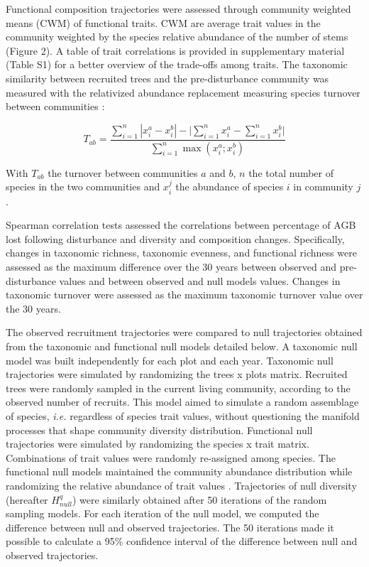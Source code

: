 \documentclass[fleqn,10pt]{ArtEcoFoG} %
\begin{document}
Functional composition trajectories were assessed through community weighted means (CWM) of functional traits. CWM are average trait values in the community weighted by the species relative abundance of the number of stems \citep{Diaz2007} (Figure 2).
A table of trait correlations is provided in supplementary material (Table S1) for a better overview of the trade-offs among traits.
The taxonomic similarity between recruited trees and the pre-disturbance community was measured with the relativized abundance replacement measuring species turnover between communities \citep{Podani2013a}:

\begin{equation}
T_{ab}=\frac{\sum_{i=1}^{n}|x_i^a - x_i^b| - \bigg| \sum_{i=1}^{n}{x_i^a} - \sum_{i=1}^{n}{x_i^b} \bigg|}{\sum_{i=1}^{n}\max{\left( x_i^a;x_i^b \right)}}
\label{eq:formNestedness}
\end{equation}

With \(T_{ab}\) the turnover between communities \(a\) and \(b\), \(n\) the total number of species in the two communities and \(x_{i}^{j}\) the abundance of species \(i\) in community \(j\).

Spearman correlation tests assessed the correlations between percentage of AGB lost following disturbance and diversity and composition changes. Specifically, changes in taxonomic richness, taxonomic evenness, and functional richness were assessed as the maximum difference over the 30 years between observed and pre-disturbance values and between observed and null models values. Changes in taxonomic turnover were assessed as the maximum taxonomic turnover value over the 30 years.

The observed recruitment trajectories were compared to null trajectories obtained from the taxonomic and functional null models detailed below. A taxonomic null model was built independently for each plot and each year. Taxonomic null trajectories were simulated by randomizing the trees x plots matrix. Recruited trees were randomly sampled in the current living community, according to the observed number of recruits. This model aimed to simulate a random assemblage of species, \emph{i.e.} regardless of species trait values, without questioning the manifold processes that shape community diversity distribution. Functional null trajectories were simulated by randomizing the species x trait matrix. Combinations of trait values were randomly re-assigned among species. The functional null models maintained the community abundance distribution while randomizing the relative abundance of trait values \citep{Mason2013}.
Trajectories of null diversity (hereafter \(H^q_{null}\)) were similarly obtained after 50 iterations of the random sampling models.
For each iteration of the null model, we computed the difference between null and observed trajectories. The 50 iterations made it possible to calculate a 95\% confidence interval of the difference between null and observed trajectories.
\end{document}
